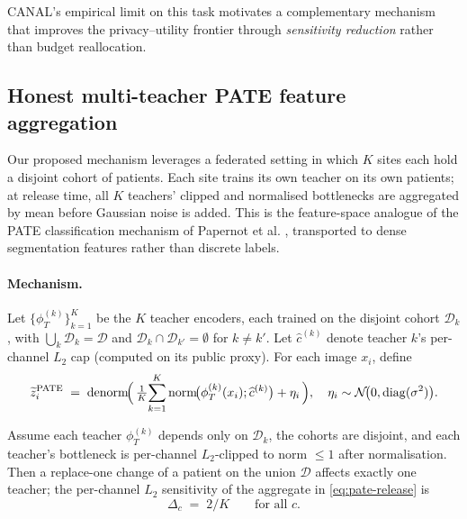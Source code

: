 CANAL's empirical limit on this task motivates a complementary
mechanism that improves the privacy--utility frontier through
\emph{sensitivity reduction} rather than budget reallocation.

\subsection{Honest multi-teacher PATE feature aggregation}
\label{ssec:pate}

Our proposed mechanism leverages a federated setting in which $K$
sites each hold a disjoint cohort of patients. Each site trains its
own teacher on its own patients; at release time, all $K$ teachers'
clipped and normalised bottlenecks are aggregated by mean before
Gaussian noise is added. This is the feature-space analogue of
the PATE classification mechanism of Papernot et al.
\cite{papernot2017semi,papernot2018scalable}, transported to dense
segmentation features rather than discrete labels.

\paragraph{Mechanism.}
Let $\{\phi_T^{(k)}\}_{k=1}^K$ be the $K$ teacher encoders, each
trained on the disjoint cohort $\mathcal{D}_k$, with
$\bigcup_k \mathcal{D}_k = \mathcal{D}$ and $\mathcal{D}_k \cap
\mathcal{D}_{k'} = \emptyset$ for $k \ne k'$. Let $\widehat{c}^{(k)}$
denote teacher $k$'s per-channel $L_2$ cap (computed on its public
proxy). For each image $x_i$, define
\begin{equation}
\widetilde{z}_i^{\mathrm{PATE}}
 \;=\; \mathrm{denorm}\!\Bigl(\,
   \tfrac{1}{K}\!\sum_{k=1}^K \mathrm{norm}\!\bigl(\phi_T^{(k)}(x_i);\widehat{c}^{(k)}\bigr)
   + \eta_i \,\Bigr),
\quad \eta_i \sim \mathcal{N}\!\bigl(0,\mathrm{diag}(\sigma^2)\bigr).
\label{eq:pate-release}
\end{equation}

\begin{theorem}
\label{thm:pate-sens}
Assume each teacher $\phi_T^{(k)}$ depends only on $\mathcal{D}_k$, the
cohorts are disjoint, and each teacher's bottleneck is per-channel
$L_2$-clipped to norm $\le 1$ after normalisation. Then a replace-one
change of a patient on the union $\mathcal{D}$ affects exactly one
teacher; the per-channel $L_2$ sensitivity of the aggregate in
\eqref{eq:pate-release} is
\begin{equation}
\Delta_c \;=\; 2/K \qquad \text{for all } c.
\label{eq:pate-delta}
\end{equation}
\end{theorem}

